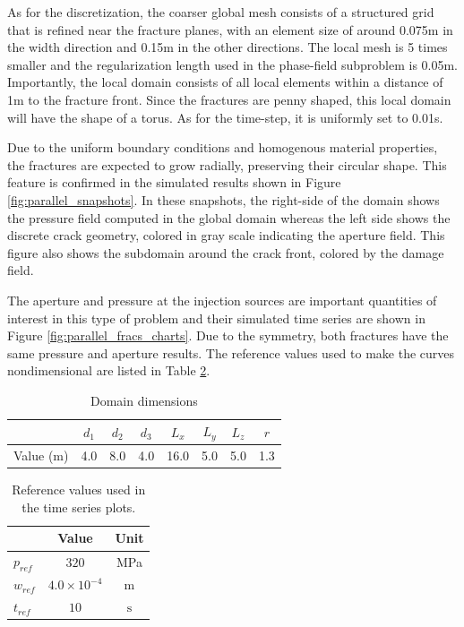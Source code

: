 As for the discretization, the coarser global mesh consists of a structured grid that is refined near the fracture planes, with an element size of around 0.075m in the width direction and 0.15m in the other directions. The local mesh is 5 times smaller and the regularization length used in the phase-field subproblem is 0.05m. Importantly, the local domain consists of all local elements within a distance of 1m to the fracture front. Since the fractures are penny shaped, this local domain will have the shape of a torus. As for the time-step, it is uniformly set to 0.01s.

Due to the uniform boundary conditions and homogenous material properties, the fractures are expected to grow radially, preserving their circular shape. This feature is confirmed in the simulated results shown in Figure \ref{fig:parallel_snapshots}. In these snapshots, the right-side of the domain shows the pressure field computed in the global domain whereas the left side shows the discrete crack geometry, colored in gray scale indicating the aperture field. This figure also shows the subdomain around the crack front, colored by the damage field.

The aperture and pressure at the injection sources are important quantities of interest in this type of problem and their simulated time series are shown in Figure \ref{fig:parallel_fracs_charts}. Due to the symmetry, both fractures have the same pressure and aperture results. The reference values used to make the curves nondimensional are listed in Table \ref{parallel_refs}.

\begin{table}[ht]
  \centering
  \caption{Domain dimensions}
  \begin{tabular}[t]{lccccccc}
  \hline
  &$d_1$&$d_2$&$d_3$&$L_x$&$L_y$&$L_z$&$r$\\  
  \hline
  Value (m) & 4.0 & 8.0 & 4.0 & 16.0 & 5.0 & 5.0 & 1.3\\
  \hline
  \end{tabular}
  \label{parallel_measures}
\end{table}%

\begin{table}[ht]
  \centering
  \caption{Reference values used in the time series plots.}
  \begin{tabular}[t]{lcc}
  \hline
  &Value &Unit \\
  \hline
  $p_{ref}$&$320$&MPa\\
  $w_{ref}$&$4.0\times10^{-4}$&m\\
  $t_{ref}$&$10$&$\text{s}$\\
  \hline
  \end{tabular}
  \label{parallel_refs}
\end{table}%

